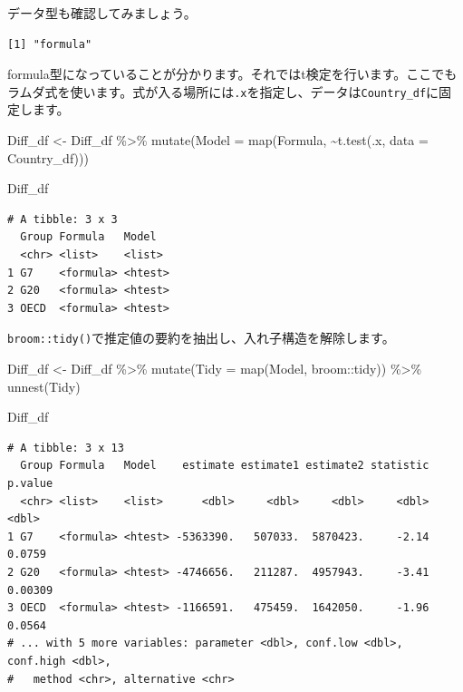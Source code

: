 \documentclass[
  a4paper,
  pandoc,
  ja=standard,
  jafont=haranoaji]{bxjsbook}
\newenvironment{Shaded}{\begin{snugshade}}{\end{snugshade}}
\newcommand{\AttributeTok}[1]{\textcolor[rgb]{0.00,0.48,0.65}{#1}}
\newcommand{\DecValTok}[1]{\textcolor[rgb]{0.68,0.00,0.00}{#1}}
\newcommand{\FunctionTok}[1]{\textcolor[rgb]{0.28,0.35,0.67}{#1}}
\newcommand{\NormalTok}[1]{\textcolor[rgb]{0.00,0.48,0.65}{#1}}
\newcommand{\OtherTok}[1]{\textcolor[rgb]{0.00,0.48,0.65}{#1}}
\newcommand{\SpecialCharTok}[1]{\textcolor[rgb]{0.37,0.37,0.37}{#1}}
\begin{document}
データ型も確認してみましょう。

\begin{Shaded}
\end{Shaded}

\begin{verbatim}
[1] "formula"
\end{verbatim}

formula型になっていることが分かります。それではt検定を行います。ここでもラムダ式を使います。式が入る場所には\texttt{.x}を指定し、データは\texttt{Country\_df}に固定します。

\begin{Shaded}
\begin{Highlighting}[numbers=left,,]
\NormalTok{Diff\_df }\OtherTok{\textless{}{-}}\NormalTok{ Diff\_df }\SpecialCharTok{\%\textgreater{}\%}
  \FunctionTok{mutate}\NormalTok{(}\AttributeTok{Model =} \FunctionTok{map}\NormalTok{(Formula, }\SpecialCharTok{\textasciitilde{}}\FunctionTok{t.test}\NormalTok{(.x, }\AttributeTok{data =}\NormalTok{ Country\_df)))}

\NormalTok{Diff\_df}
\end{Highlighting}
\end{Shaded}

\begin{verbatim}
# A tibble: 3 x 3
  Group Formula   Model  
  <chr> <list>    <list> 
1 G7    <formula> <htest>
2 G20   <formula> <htest>
3 OECD  <formula> <htest>
\end{verbatim}

\texttt{broom::tidy()}で推定値の要約を抽出し、入れ子構造を解除します。

\begin{Shaded}
\begin{Highlighting}[numbers=left,,]
\NormalTok{Diff\_df }\OtherTok{\textless{}{-}}\NormalTok{ Diff\_df }\SpecialCharTok{\%\textgreater{}\%}
  \FunctionTok{mutate}\NormalTok{(}\AttributeTok{Tidy =} \FunctionTok{map}\NormalTok{(Model, broom}\SpecialCharTok{::}\NormalTok{tidy)) }\SpecialCharTok{\%\textgreater{}\%}
  \FunctionTok{unnest}\NormalTok{(Tidy)}

\NormalTok{Diff\_df}
\end{Highlighting}
\end{Shaded}

\begin{verbatim}
# A tibble: 3 x 13
  Group Formula   Model    estimate estimate1 estimate2 statistic p.value
  <chr> <list>    <list>      <dbl>     <dbl>     <dbl>     <dbl>   <dbl>
1 G7    <formula> <htest> -5363390.   507033.  5870423.     -2.14 0.0759 
2 G20   <formula> <htest> -4746656.   211287.  4957943.     -3.41 0.00309
3 OECD  <formula> <htest> -1166591.   475459.  1642050.     -1.96 0.0564 
# ... with 5 more variables: parameter <dbl>, conf.low <dbl>, conf.high <dbl>,
#   method <chr>, alternative <chr>
\end{verbatim}
\end{document}
